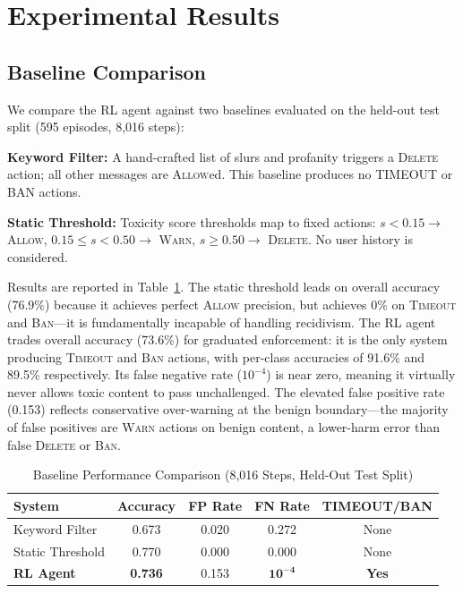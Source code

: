 \documentclass[journal]{IEEEtran}
\begin{document}
\section{Experimental Results}
\label{sec:results}

\subsection{Baseline Comparison}

We compare the RL agent against two baselines evaluated on the held-out test split
(595 episodes, 8,016 steps):

\textbf{Keyword Filter:} A hand-crafted list of slurs and profanity triggers a
\textsc{Delete} action; all other messages are \textsc{Allow}ed. This baseline produces
no TIMEOUT or BAN actions.

\textbf{Static Threshold:} Toxicity score thresholds map to fixed actions:
$s < 0.15 \to$ \textsc{Allow}, $0.15 \leq s < 0.50 \to$ \textsc{Warn},
$s \geq 0.50 \to$ \textsc{Delete}. No user history is considered.

Results are reported in Table~\ref{tab:baseline}. The static threshold leads on overall
accuracy (76.9\%) because it achieves perfect \textsc{Allow} precision, but achieves 0\%
on \textsc{Timeout} and \textsc{Ban}---it is fundamentally incapable of handling recidivism.
The RL agent trades overall accuracy (73.6\%) for graduated enforcement: it is the only
system producing \textsc{Timeout} and \textsc{Ban} actions, with per-class accuracies of
91.6\% and 89.5\% respectively. Its false negative rate ($10^{-4}$) is near zero, meaning
it virtually never allows toxic content to pass unchallenged. The elevated false positive
rate (0.153) reflects conservative over-warning at the benign boundary---the majority of
false positives are \textsc{Warn} actions on benign content, a lower-harm error than
false \textsc{Delete} or \textsc{Ban}.

\begin{table}[!t]
  \renewcommand{\arraystretch}{1.3}
  \caption{Baseline Performance Comparison (8,016 Steps, Held-Out Test Split)}
  \label{tab:baseline}
  \centering
  \begin{tabular}{lcccc}
    \toprule
    System & Accuracy & FP Rate & FN Rate & TIMEOUT/BAN \\
    \midrule
    Keyword Filter   & 0.673 & 0.020 & 0.272 & None \\
    Static Threshold & 0.770 & 0.000 & 0.000 & None \\
    \textbf{RL Agent}& \textbf{0.736} & 0.153 & $\mathbf{10^{-4}}$ & \textbf{Yes} \\
    \bottomrule
  \end{tabular}
\end{table}
\end{document}

